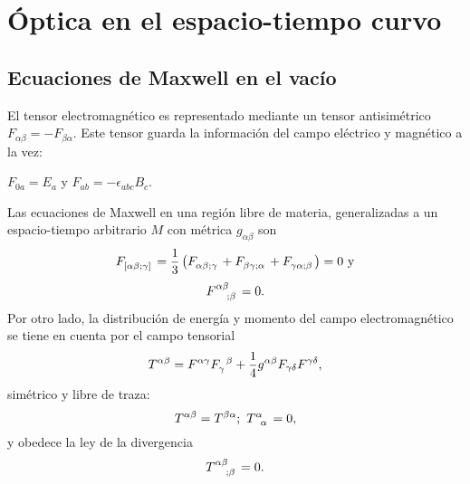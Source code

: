 \section{Óptica en el espacio-tiempo curvo}
\subsection{Ecuaciones de Maxwell en el vacío}
El tensor electromagnético es representado mediante un tensor antisimétrico $F_{\alpha\beta}=-F_{\beta\alpha}$. Este tensor guarda la información del campo eléctrico y magnético a la vez:

\begin{center}
$F_{0a}=E_a$ y $F_{ab}=-\epsilon_{abc}B_c$.
\end{center}
Las ecuaciones de Maxwell en una región libre de materia, generalizadas a un espacio-tiempo arbitrario $M$ con métrica $g_{\alpha\beta}$ son
\begin{equation}\label{maxwell1}
	F\indices{_{[\alpha\beta;\gamma]}}=\frac{1}{3}\left( F\indices{_{\alpha\beta;\gamma}}+F\indices{_{\beta\gamma;\alpha}}+F\indices{_{\gamma\alpha;\beta}} \right)=0 \text{ y}
\end{equation}
\begin{equation}\label{maxwell2}
	F\indices{^{\alpha\beta}_{;\beta}}=0.
\end{equation}
Por otro lado, la distribución de energía y momento del campo electromagnético se tiene en cuenta por el campo tensorial
\begin{equation}
	T^{\alpha\beta}=F^{\alpha\gamma}F\indices{_{\gamma}^\beta}+\frac{1}{4}g^{\alpha\beta}F_{\gamma\delta}F^{\gamma\delta},
\end{equation}
simétrico y libre de traza:
\begin{equation}
T^{\alpha\beta}=T^{\beta\alpha}; \ T\indices{^\alpha_\alpha}=0,
\end{equation}
y obedece la ley de la divergencia
\begin{equation}
	T\indices{^{\alpha\beta}_{;\beta}}=0.
\end{equation}
